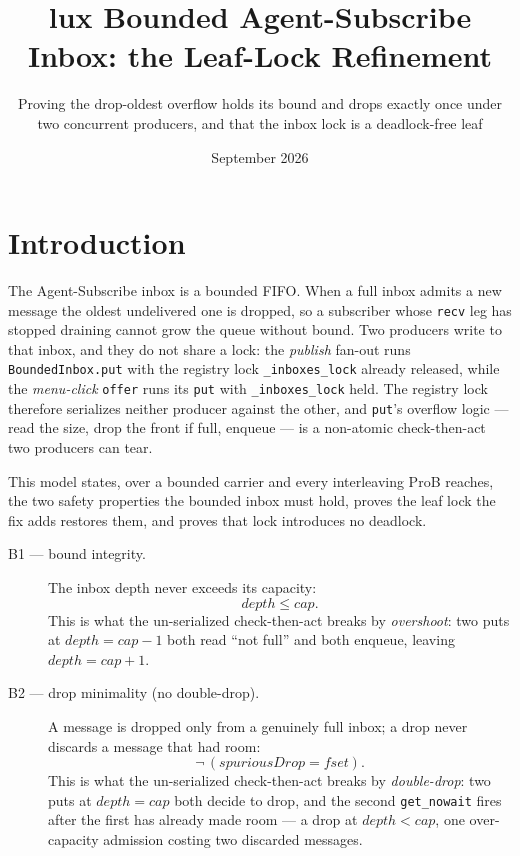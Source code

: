 \documentclass[a4paper,10pt,fleqn]{article}
\begin{document}
\title{lux Bounded Agent-Subscribe Inbox: the Leaf-Lock Refinement}
\author{Proving the drop-oldest overflow holds its bound and drops exactly once
  under two concurrent producers, and that the inbox lock is a deadlock-free leaf}
\date{September 2026}
\maketitle

\section{Introduction}

The Agent-Subscribe inbox is a bounded FIFO. When a full inbox admits a new
message the oldest undelivered one is dropped, so a subscriber whose
\texttt{recv} leg has stopped draining cannot grow the queue without bound. Two
producers write to that inbox, and they do not share a lock: the \emph{publish}
fan-out runs \texttt{BoundedInbox.put} with the registry lock
\texttt{\_inboxes\_lock} already released, while the \emph{menu-click}
\texttt{offer} runs its \texttt{put} with \texttt{\_inboxes\_lock} held. The
registry lock therefore serializes neither producer against the other, and
\texttt{put}'s overflow logic --- read the size, drop the front if full, enqueue
--- is a non-atomic check-then-act two producers can tear.

This model states, over a bounded carrier and every interleaving ProB reaches,
the two safety properties the bounded inbox must hold, proves the leaf lock the
fix adds restores them, and proves that lock introduces no deadlock.

\begin{description}
  \item[B1 --- bound integrity.] The inbox depth never exceeds its capacity:
    \[ depth \leq cap. \]
    This is what the un-serialized check-then-act breaks by \emph{overshoot}:
    two puts at $depth = cap - 1$ both read ``not full'' and both enqueue,
    leaving $depth = cap + 1$.
  \item[B2 --- drop minimality (no double-drop).] A message is dropped only from
    a genuinely full inbox; a drop never discards a message that had room:
    \[ \lnot\, (spuriousDrop = fset). \]
    This is what the un-serialized check-then-act breaks by \emph{double-drop}:
    two puts at $depth = cap$ both decide to drop, and the second
    \texttt{get\_nowait} fires after the first has already made room --- a drop
    at $depth < cap$, one over-capacity admission costing two discarded messages.
\end{description}
\end{document}

